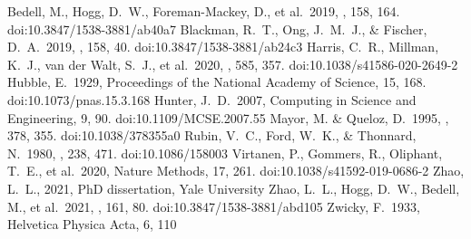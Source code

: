 \documentclass[modern]{aastex631}
\begin{document}
\begin{thebibliography}{dummy}
   Bedell, M., Hogg, D.~W., Foreman-Mackey, D., et al.\ 2019, \aj, 158, 164. doi:10.3847/1538-3881/ab40a7
   Blackman, R.~T., Ong, J.~M.~J., \& Fischer, D.~A.\ 2019, \aj, 158, 40. doi:10.3847/1538-3881/ab24c3
   Harris, C.~R., Millman, K.~J., van der Walt, S.~J., et al.\ 2020, \nat, 585, 357. doi:10.1038/s41586-020-2649-2
   Hubble, E.\ 1929, Proceedings of the National Academy of Science, 15, 168. doi:10.1073/pnas.15.3.168
   Hunter, J.~D.\ 2007, Computing in Science and Engineering, 9, 90. doi:10.1109/MCSE.2007.55
   Mayor, M. \& Queloz, D.\ 1995, \nat, 378, 355. doi:10.1038/378355a0
   Rubin, V.~C., Ford, W.~K., \& Thonnard, N.\ 1980, \apj, 238, 471. doi:10.1086/158003
   Virtanen, P., Gommers, R., Oliphant, T.~E., et al.\ 2020, Nature Methods, 17, 261. doi:10.1038/s41592-019-0686-2
   Zhao, L.~L., 2021, PhD dissertation, Yale University
   Zhao, L.~L., Hogg, D.~W., Bedell, M., et al.\ 2021, \aj, 161, 80. doi:10.3847/1538-3881/abd105
   Zwicky, F.\ 1933, Helvetica Physica Acta, 6, 110
\end{thebibliography}
\end{document}
